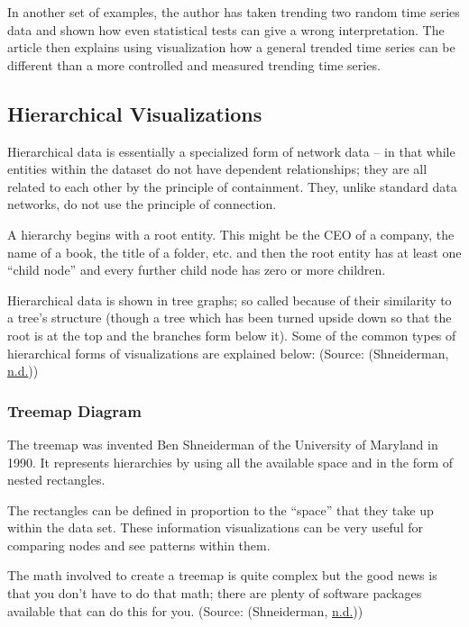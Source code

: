 \documentclass[]{book}
\begin{document}
In another set of examples, the author has taken trending two random time series data and shown how even statistical tests can give a wrong interpretation. The article then explains using visualization how a general trended time series can be different than a more controlled and measured trending time series.

\hypertarget{hierarchical-visualizations}{%
\subsection{Hierarchical Visualizations}\label{hierarchical-visualizations}}

Hierarchical data is essentially a specialized form of network data -- in that while entities within the dataset do not have dependent relationships; they are all related to each other by the principle of containment. They, unlike standard data networks, do not use the principle of connection.

A hierarchy begins with a root entity. This might be the CEO of a company, the name of a book, the title of a folder, etc. and then the root entity has at least one ``child node'' and every further child node has zero or more children.

Hierarchical data is shown in tree graphs; so called because of their similarity to a tree's structure (though a tree which has been turned upside down so that the root is at the top and the branches form below it). Some of the common types of hierarchical forms of visualizations are explained below:
(Source: (Shneiderman, \protect\hyperlink{ref-tier-chart}{n.d.}))

\hypertarget{treemap-diagram}{%
\subsubsection{Treemap Diagram}\label{treemap-diagram}}

The treemap was invented Ben Shneiderman of the University of Maryland in 1990. It represents hierarchies by using all the available space and in the form of nested rectangles.

The rectangles can be defined in proportion to the ``space'' that they take up within the data set. These information visualizations can be very useful for comparing nodes and see patterns within them.

The math involved to create a treemap is quite complex but the good news is that you don't have to do that math; there are plenty of software packages available that can do this for you.
(Source: (Shneiderman, \protect\hyperlink{ref-tier-chart}{n.d.}))
\end{document}
